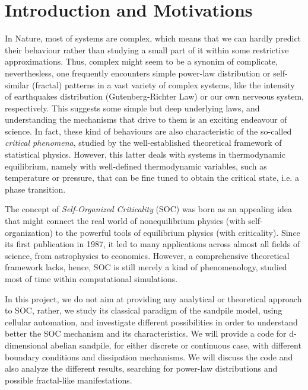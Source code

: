 \chapter{Introduction and Motivations}
\thispagestyle{fancy}


In Nature, most of systems are complex, 
which means that we can hardly predict their behaviour rather than studying a small part of it within some restrictive approximations.
Thus, complex might seem to be a synonim of complicate, 
neverthesless, one frequently encounters simple power-law distribution or self-similar (fractal) patterns in a vast variety of complex systems, 
like the intensity of earthquakes distribution (Gutenberg-Richter Law) or our own nerveous system, respectively. 
This suggests some simple but deep underlying laws, and understanding the mechanisms that drive to them is an exciting endeavour of science.
In fact, these kind of behaviours are also characteristic of the so-called \emph{critical phenomena}, studied by the well-established theoretical framework of statistical physics.
However, this latter deals with systems in thermodynamic equilibrium, namely with well-defined thermodynamic variables, such as temperature or pressure, 
that can be fine tuned to obtain the critical state, i.e. a phase transition.


The concept of \emph{Self-Organized Criticality} (SOC) was born as an appealing idea that might connect 
the real world of nonequilibrium physics (with self-organization) to the powerful tools of equilibrium physics (with criticality). 
Since its first publication in 1987, it led to many applications across almost all fields of science, from astrophysics to economics.
However, a comprehensive theoretical framework lacks, hence, SOC is still merely a kind of phenomenology, studied most of time within computational simulations.
 
In this project, we do not aim at providing any analytical or theoretical approach to SOC, 
rather, we study its classical paradigm of the sandpile model, using cellular automation, 
and investigate different possibilities in order to understand better the SOC mechanism and its characteristics.
We will provide a code for d-dimensional abelian sandpile, for either discrete or continuous case, with different boundary conditions and dissipation mechanisms.
We will discuss the code and also analyze the different results, searching for power-law distributions and possible fractal-like manifestations. 


